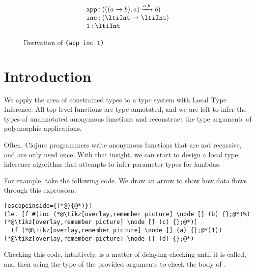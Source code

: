 \documentclass[9pt]{extarticle}
\begin{document}
\begin{landscape}
\begin{figure}
  $$
  \begin{array}{l}
    \hastype{\texttt{app}}{\ltiArrow{(\ltiArrow{a}{}{b}, a)}{a, b}{b}}\\
    \hastype{\texttt{inc}}{\ltiArrow{\ltiInt}{}{\ltiInt}}\\
    \hastype{\texttt{1}}{\ltiInt}
  \end{array}
  $$
\caption{Derivation of \texttt{(app inc 1)}
  }
\end{figure}
\end{landscape}

\newpage


\section{Introduction}

We apply the area of constrained types to a type system with Local Type Inference.
All top level functions are type-annotated, and we are left to infer the types of
unannotated anonymous functions and reconstruct the type arguments of polymorphic
applications.

Often, Clojure programmers write anonymous functions that are not recursive, and
are only used once. With that insight, we can start to design a local type inference
algorithm that attempts to infer parameter types for lambdas.

For example, take the following code. We draw an arrow to show how data flows
through this expression.

\begin{lstlisting}[escapeinside={(*@}{@*)}]
(let [f #(inc (*@\tikz[overlay,remember picture] \node [] (b) {};@*)%)(*@\tikz[overlay,remember picture] \node [] (c) {};@*)]
  (f (*@\tikz[overlay,remember picture] \node [] (a) {};@*)1))(*@\tikz[overlay,remember picture] \node [] (d) {};@*)
\end{lstlisting}

Checking this code, intuitively, is a matter of delaying checking
 until it is called, and then using the type of the provided arguments
to check the body of .
\end{document}
